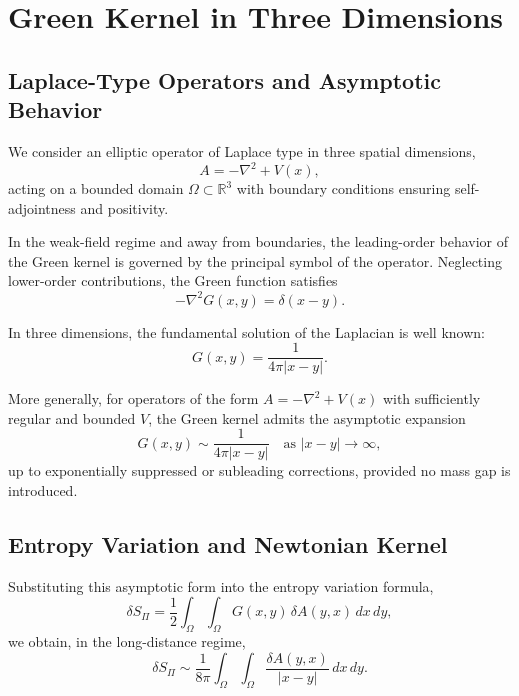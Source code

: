 \section{Green Kernel in Three Dimensions}

  \subsection{Laplace-Type Operators and Asymptotic Behavior}

    We consider an elliptic operator of Laplace type in three spatial dimensions,
    \begin{equation}
      A = -\nabla^2 + V(x),
    \end{equation}
    acting on a bounded domain $\Omega \subset \mathbb{R}^3$
    with boundary conditions ensuring self-adjointness and positivity.

    In the weak-field regime and away from boundaries,
    the leading-order behavior of the Green kernel is governed
    by the principal symbol of the operator.
    Neglecting lower-order contributions, the Green function satisfies
    \begin{equation}
      -\nabla^2 G(x,y) = \delta(x-y).
    \end{equation}

    In three dimensions, the fundamental solution of the Laplacian
    is well known:
    \begin{equation}
      G(x,y) = \frac{1}{4\pi |x-y|}.
    \end{equation}

    More generally, for operators of the form $A = -\nabla^2 + V(x)$
    with sufficiently regular and bounded $V$,
    the Green kernel admits the asymptotic expansion
    \begin{equation}
      G(x,y) \sim \frac{1}{4\pi |x-y|}
      \quad \text{as } |x-y| \to \infty,
    \end{equation}
    up to exponentially suppressed or subleading corrections,
    provided no mass gap is introduced.

  \subsection{Entropy Variation and Newtonian Kernel}

    Substituting this asymptotic form into the entropy variation formula,
    \begin{equation}
      \delta S_\Pi
      = \frac12 \int_\Omega \int_\Omega
      G(x,y)\, \delta A(y,x)\, dx\, dy,
    \end{equation}
    we obtain, in the long-distance regime,
    \begin{equation}
      \delta S_\Pi
      \sim
      \frac{1}{8\pi}
      \int_\Omega \int_\Omega
      \frac{\delta A(y,x)}{|x-y|}\, dx\, dy.
    \end{equation}

